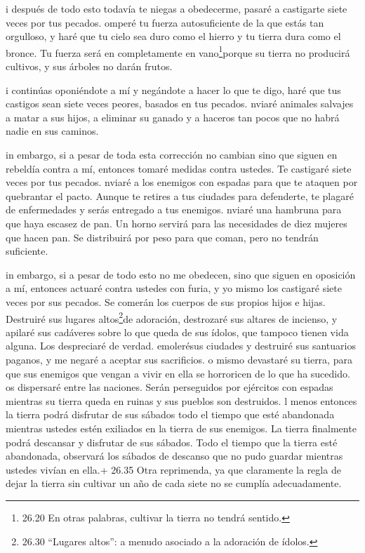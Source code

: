  i después de todo esto todavía te niegas a obedecerme,
pasaré a castigarte siete veces por tus pecados.  omperé tu
fuerza autosuficiente de la que estás tan orgulloso, y haré que tu cielo
sea duro como el hierro y tu tierra dura como el bronce. 
Tu fuerza será en completamente en vano\footnote{26.20 En otras
  palabras, cultivar la tierra no tendrá sentido.}porque su tierra no
producirá cultivos, y sus árboles no darán frutos.

 i continúas oponiéndote a mí y negándote a hacer lo que te
digo, haré que tus castigos sean siete veces peores, basados en tus
pecados.  nviaré animales salvajes a matar a sus hijos, a
eliminar su ganado y a haceros tan pocos que no habrá nadie en sus
caminos.

 in embargo, si a pesar de toda esta corrección no cambian
sino que siguen en rebeldía contra a mí,  entonces tomaré
medidas contra ustedes. Te castigaré siete veces por tus pecados.
 nviaré a los enemigos con espadas para que te ataquen por
quebrantar el pacto. Aunque te retires a tus ciudades para defenderte,
te plagaré de enfermedades y serás entregado a tus enemigos.
 nviaré una hambruna para que haya escasez de pan. Un horno
servirá para las necesidades de diez mujeres que hacen pan. Se
distribuirá por peso para que coman, pero no tendrán suficiente.

 in embargo, si a pesar de todo esto no me obedecen, sino
que siguen en oposición a mí,  entonces actuaré contra
ustedes con furia, y yo mismo los castigaré siete veces por sus pecados.
 Se comerán los cuerpos de sus propios hijos e hijas.
 Destruiré sus lugares altos\footnote{26.30 ``Lugares
  altos'': a menudo asociado a la adoración de ídolos.}de adoración,
destrozaré sus altares de incienso, y apilaré sus cadáveres sobre lo que
queda de sus ídolos, que tampoco tienen vida alguna. Los despreciaré de
verdad.  emolerésus ciudades y destruiré sus santuarios
paganos, y me negaré a aceptar sus sacrificios.  o mismo
devastaré su tierra, para que sus enemigos que vengan a vivir en ella se
horroricen de lo que ha sucedido.  os dispersaré entre las
naciones. Serán perseguidos por ejércitos con espadas mientras su tierra
queda en ruinas y sus pueblos son destruidos.  l menos
entonces la tierra podrá disfrutar de sus sábados todo el tiempo que
esté abandonada mientras ustedes estén exiliados en la tierra de sus
enemigos. La tierra finalmente podrá descansar y disfrutar de sus
sábados.  Todo el tiempo que la tierra esté abandonada,
observará los sábados de descanso que no pudo guardar mientras ustedes
vivían en ella.+ 26.35 Otra reprimenda, ya que claramente la regla de
dejar la tierra sin cultivar un año de cada siete no se cumplía
adecuadamente.


